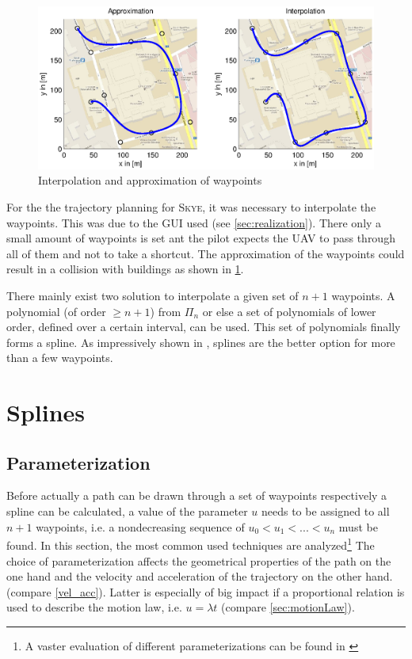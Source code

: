 \begin{figure}[H]
  \begin{minipage}[t]{0.9\textwidth}
    \includegraphics[width = \textwidth]{graphics/ApproxInterpol.eps}
  \end{minipage}
  \caption{Interpolation and approximation of waypoints}
  \label{fig:ApproxInterpol}
\end{figure}

For the the trajectory planning for \textsc{Skye}, it was necessary to interpolate the waypoints. This was due to the GUI used (see \ref{sec:realization}). There only a small amount of waypoints is set ant the pilot expects the UAV to pass through all of them and not to take a shortcut. The approximation of the waypoints could result in a collision with buildings as shown in \ref{fig:ApproxInterpol}.


There mainly exist two solution to interpolate a given set of $n+1$ waypoints. A polynomial (of order $\ge n+1$) from $\varPi_{n}$ or else a set of polynomials of lower order, defined over a certain interval, can be used. This set of polynomials finally forms a spline. As impressively shown in \cite{wolfgang}, splines are the better option for more than a few waypoints. 



\section{Splines}
\label{sec:splines}
\subsection{Parameterization}
Before actually a path can be drawn through a set of waypoints respectively a spline can be calculated, a value of the parameter $u$ needs to be assigned to all $n+1$ waypoints, i.e. a nondecreasing sequence of $u_0 < u_1 < ...< u_n$ must be found. In this section, the most common used techniques are analyzed\footnote{A vaster evaluation of different parameterizations can be found in \cite{haron}} The choice of parameterization affects the geometrical properties of the path on the one hand and the velocity and acceleration of the trajectory on the other hand. (compare \eqref{vel_acc}). Latter is especially of big impact if a proportional relation is used to describe the motion law, i.e. $u=\lambda t$ (compare \ref{sec:motionLaw}).

